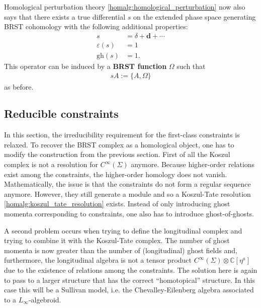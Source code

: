     Homological perturbation theory \ref{homalg:homological_perturbation} now also says that there exists a true differential $s$ on the extended phase space  generating BRST cohomology with the following additional properties:
    \begin{align}
        s &= \delta + \mathbf{d} + \cdots\nonumber\\
        \varepsilon(s) &= 1\\
        \mathrm{gh}(s) &= 1.\nonumber
    \end{align}
    This operator can be induced by a \textbf{BRST function} $\Omega$ such that
    \begin{gather}
        sA := \{A,\Omega\}
    \end{gather}
    as before.

\subsection{Reducible constraints}

    In this section, the irreducibility requirement for the first-class constraints is relaxed. To recover the BRST complex as a homological object, one has to modify the construction from the previous section. First of all the Koszul complex is not a resolution for $C^\infty(\Sigma)$ anymore. Because higher-order relations exist among the constraints, the higher-order homology does not vanish. Mathematically, the issue is that the constraints do not form a regular sequence anymore. However, they still generate a module and so a Koszul-Tate resolution \ref{homalg:koszul_tate_resolution} exists. Instead of only introducing ghost momenta corresponding to constraints, one also has to introduce ghost-of-ghosts.

    A second problem occurs when trying to define the longitudinal complex and trying to combine it with the Koszul-Tate complex. The number of ghost momenta is now greater than the number of (longitudinal) ghost fields and, furthermore, the longitudinal algebra is not a tensor product $C^\infty(\Sigma)\otimes\mathbb{C}[\eta^a]$ due to the existence of relations among the constraints. The solution here is again to pass to a larger structure that has the correct ``homotopical'' structure. In this case this will be a Sullivan model, i.e. the Chevalley-Eilenberg algebra associated to a $L_\infty$-algebroid.

